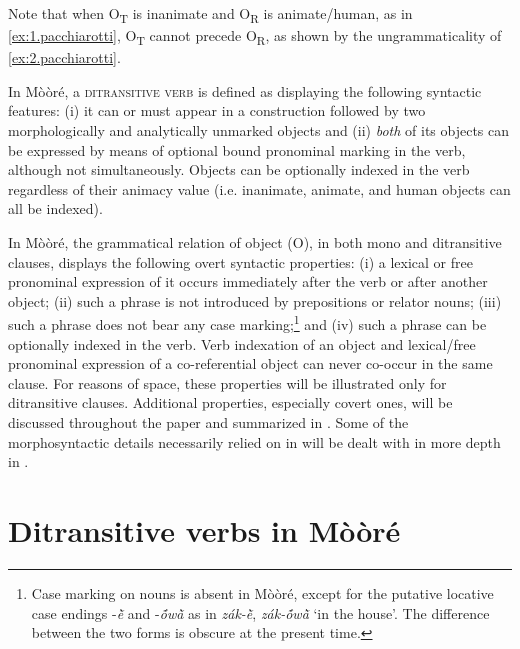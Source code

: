 \documentclass[output=paper]{langsci/langscibook}
\begin{document}
Note that when O\textsubscript{T} is inanimate and O\textsubscript{R} is animate/human, as in \ref{ex:1.pacchiarotti}, O\textsubscript{T} cannot precede O\textsubscript{R}, as shown by the ungrammaticality of \ref{ex:2.pacchiarotti}.

\z

In Mòòré, a \textsc{ditransitive verb} is defined as displaying the following syntactic features: (i) it can or must appear in a construction followed by two morphologically and analytically unmarked objects and (ii) \textit{both} of its objects can be expressed by means of optional bound pronominal marking in the verb, although not simultaneously. Objects can be optionally indexed in the verb regardless of their animacy value (i.e. inanimate, animate, and human objects can all be indexed).

In Mòòré, the grammatical relation of object (O), in both mono and ditransitive clauses, displays the following overt syntactic properties: (i) a lexical or free pronominal expression of it occurs immediately after the verb or after another object; (ii) such a phrase is not introduced by prepositions or relator nouns; (iii) such a phrase does not bear any case marking;\footnote{Case marking on nouns is absent in Mòòré, except for the putative locative case endings -\textit{\`{\~{e}} }and -\textit{\'{\~{o}}w\`{\~{a}}} as in \textit{z\'{a}k-\`{\~{e}}}, \textit{z\'{a}k-\'{\~{o}}w\`{\~{a}}} `in the house'. The difference between the two forms is obscure at the present time.} and (iv) such a phrase can be optionally indexed in the verb. Verb indexation of an object and lexical/free pronominal expression of a co-referential object can never co-occur in the same clause. For reasons of space, these properties will be illustrated only for ditransitive clauses. Additional properties, especially covert ones, will be discussed throughout the paper and summarized in . Some of the morphosyntactic details necessarily relied on in   will be dealt with in more depth in .

\section{Ditransitive verbs in Mòòré}\label{§3:ditransitive.pacchiarotti}
\end{document}
